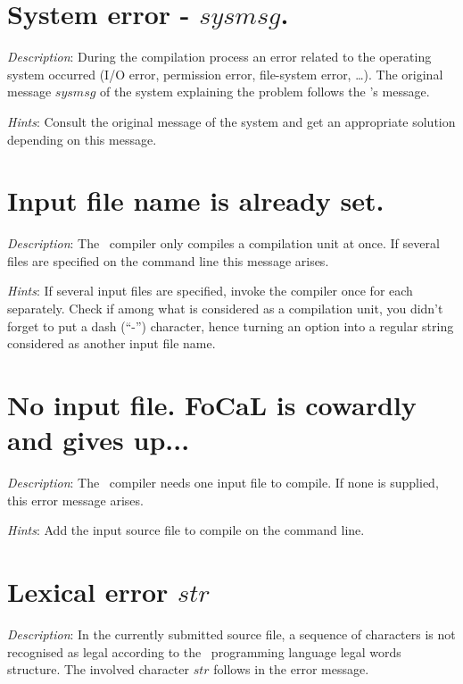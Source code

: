 \section*{System error - $sysmsg$.}
{\em Description}: During the compilation process an error related to
the operating system occurred (I/O error, permission error, file-system
error, \ldots). The original message $sysmsg$ of the system explaining
the problem follows the \focal's message.

{\em Hints}: Consult the original message of the system and get an
appropriate solution depending on this message.



\section*{Input file name is already set.}
{\em Description}: The \focal\ compiler only compiles a compilation unit at
once. If several files are specified on the command line this message
arises.

{\em Hints}: If several input files are specified, invoke the compiler
once for each separately. Check if among what is considered as a
compilation unit, you didn't forget to put a dash (``-'') character,
hence turning an option into a regular string considered as another
input file name.



\section*{No input file. FoCaL is cowardly and gives up...}
{\em Description}: The \focal\ compiler needs one input file to
compile. If none is supplied, this error message arises.

{\em Hints}: Add the input source file to compile on the command
line.



\section*{Lexical error $str$}
{\em Description}: In the currently submitted source file, a sequence
of characters is not recognised as legal according to the
\focal\ programming language legal words structure. The involved
character $str$ follows in the error message.

